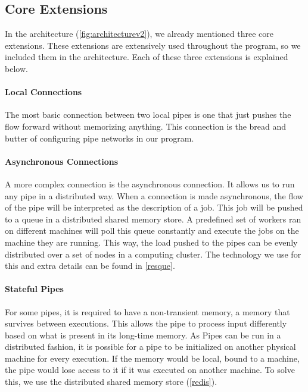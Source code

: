 \subsection{Core Extensions}

In the architecture (\autoref{fig:architecturev2}), we already mentioned three core extensions. These extensions are extensively used throughout the program, so we included them in the architecture. Each of these three extensions is explained below.

\paragraph{Local Connections}

The most basic connection between two local pipes is one that just pushes the flow forward without memorizing anything. This connection is the bread and butter of configuring pipe networks in our program.

\paragraph{Asynchronous Connections}

A more complex connection is the asynchronous connection. It allows us to run any pipe in a distributed way. When a connection is made asynchronous, the flow of the pipe will be interpreted as the description of a job. This job will be pushed to a queue in a distributed shared memory store. A predefined set of workers ran on different machines will poll this queue constantly and execute the jobs on the machine they are running. This way, the load pushed to the pipes can be evenly distributed over a set of nodes in a computing cluster. The technology we use for this and extra details can be found in \autoref{resque}.

\paragraph{Stateful Pipes}

For some pipes, it is required to have a non-transient memory, a memory that survives between executions. This allows the pipe to process input differently based on what is present in its long-time memory. As Pipes can be run in a distributed fashion, it is possible for a pipe to be initialized on another physical machine for every execution. If the memory would be local, bound to a machine, the pipe would lose access to it if it was executed on another machine. To solve this, we use the distributed shared memory store (\autoref{redis}).


